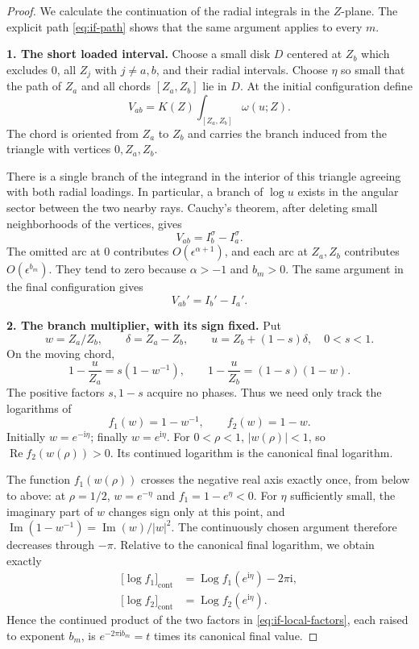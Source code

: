 \documentclass[12pt]{amsart}
\theoremstyle{definition}
\numberwithin{equation}{section}
\theoremstyle{definition}
\let\al\alpha
\let\dl\delta
\let\si\sigma
\let\om\omega
\def\beq{\begin{equation}}
\def\eeq{\end{equation}}
\begin{document}
\begin{proof}
We calculate the continuation of the radial integrals in the
$Z$-plane. The explicit path
\eqref{eq:if-path} shows that the same argument applies to every $m$.

\medskip\noindent
\textbf{1. The short loaded interval.}
Choose a small disk $D$ centered at $Z_b$ which excludes $0$, all
$Z_j$ with $j\ne a,b$, and their radial intervals. Choose $\eta$
so small that the path of $Z_a$ and all chords $[Z_a,Z_b]$ lie in $D$.
At the initial configuration define
\beq\label{eq:if-chord}
 V_{ab}=K(Z)\int_{[Z_a,Z_b]}\om(u;Z).
\eeq
The chord is oriented from $Z_a$ to $Z_b$ and carries the branch
induced from the triangle with vertices $0,Z_a,Z_b$.

There is a single branch of the integrand in the interior of this
triangle agreeing with both radial loadings. In particular, a branch
of $\log u$ exists in the angular sector between the two nearby rays.
Cauchy's theorem, after deleting small neighborhoods of the vertices,
gives
\beq\label{eq:if-chord-difference}
 V_{ab}=I_b^\si-I_a^\si.
\eeq
The omitted arc at $0$ contributes $O(\epsilon^{\al+1})$,
and each arc at $Z_a,Z_b$ contributes $O(\epsilon^{b_m})$.
They tend to zero because $\al>-1$ and $b_m>0$.
The same argument in the final configuration gives
\beq\label{eq:if-final-chord}
 V_{ab}'=I_b'-I_a'.
\eeq

\medskip\noindent
\textbf{2. The branch multiplier, with its sign fixed.}
Put
\beq
 w=Z_a/Z_b,\qquad \dl=Z_a-Z_b,
 \qquad u=Z_b+(1-s)\dl,\quad 0<s<1.
\eeq
On the moving chord,
\beq\label{eq:if-local-factors}
 1-\frac{u}{Z_a}=s(1-w^{-1}),\qquad
 1-\frac{u}{Z_b}=(1-s)(1-w).
\eeq
The positive factors $s,1-s$ acquire no phases. Thus we need only
track the logarithms of
\beq
 f_1(w)=1-w^{-1},\qquad f_2(w)=1-w.
\eeq
Initially $w=e^{-\mathrm{i}\eta}$; finally
$w=e^{\mathrm{i}\eta}$.
For $0<\rho<1$, $|w(\rho)|<1$, so
$\operatorname{Re}f_2(w(\rho))>0$.
Its continued logarithm is the canonical final logarithm.

The function $f_1(w(\rho))$ crosses the negative real axis exactly
once, from below to above: at $\rho=1/2$,
$w=e^{-\eta}$ and $f_1=1-e^\eta<0$.
For $\eta$ sufficiently small, the imaginary part of $w$ changes
sign only at this point, and
$\operatorname{Im}(1-w^{-1})=\operatorname{Im}(w)/|w|^2$.
The continuously chosen argument therefore decreases through $-\pi$.
Relative to the canonical final logarithm, we obtain exactly
\beq\label{eq:if-log-comparison}
 \begin{aligned}
 \bigl[\log f_1\bigr]_{\mathrm{cont}}
   &=\operatorname{Log}f_1(e^{\mathrm{i}\eta})-2\pi\mathrm{i},\\
 \bigl[\log f_2\bigr]_{\mathrm{cont}}
   &=\operatorname{Log}f_2(e^{\mathrm{i}\eta}).
 \end{aligned}
\eeq
Hence the continued product of the two factors in
\eqref{eq:if-local-factors}, each raised to exponent $b_m$,
is $e^{-2\pi\mathrm{i}b_m}=t$ times its canonical final value.


\end{proof}
\end{document}
